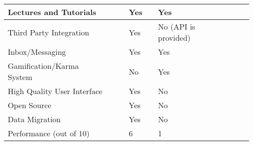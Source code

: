 \begin{table}[ht]
{\begin{tabular}{llllllll}
        \multicolumn{1}{|l|}{Lectures and Tutorials}      & \multicolumn{1}{l|}{} & \multicolumn{1}{l|}{} & \multicolumn{1}{l|}{Yes} & \multicolumn{1}{l|}{} & \multicolumn{1}{l|}{Yes}                       & \multicolumn{1}{l|}{} & \multicolumn{1}{l|}{} \\ \hline
        \multicolumn{1}{|l|}{Third Party Integration}     & \multicolumn{1}{l|}{} & \multicolumn{1}{l|}{} & \multicolumn{1}{l|}{Yes} & \multicolumn{1}{l|}{} & \multicolumn{1}{l|}{No (API is provided)}      & \multicolumn{1}{l|}{} & \multicolumn{1}{l|}{} \\ \hline
        \multicolumn{1}{|l|}{Inbox/Messaging}             & \multicolumn{1}{l|}{} & \multicolumn{1}{l|}{} & \multicolumn{1}{l|}{Yes} & \multicolumn{1}{l|}{} & \multicolumn{1}{l|}{Yes}                       & \multicolumn{1}{l|}{} & \multicolumn{1}{l|}{} \\ \hline
        \multicolumn{1}{|l|}{Gamification/Karma System}   & \multicolumn{1}{l|}{} & \multicolumn{1}{l|}{} & \multicolumn{1}{l|}{No} & \multicolumn{1}{l|}{} & \multicolumn{1}{l|}{Yes}                       & \multicolumn{1}{l|}{} & \multicolumn{1}{l|}{} \\ \hline
        \multicolumn{1}{|l|}{High Quality User Interface} & \multicolumn{1}{l|}{} & \multicolumn{1}{l|}{} & \multicolumn{1}{l|}{Yes} & \multicolumn{1}{l|}{} & \multicolumn{1}{l|}{No}                        & \multicolumn{1}{l|}{} & \multicolumn{1}{l|}{} \\ \hline
        \multicolumn{1}{|l|}{Open Source}                 & \multicolumn{1}{l|}{} & \multicolumn{1}{l|}{} & \multicolumn{1}{l|}{Yes} & \multicolumn{1}{l|}{} & \multicolumn{1}{l|}{No}                        & \multicolumn{1}{l|}{} & \multicolumn{1}{l|}{} \\ \hline
        \multicolumn{1}{|l|}{Data Migration}              & \multicolumn{1}{l|}{} & \multicolumn{1}{l|}{} & \multicolumn{1}{l|}{Yes} & \multicolumn{1}{l|}{} & \multicolumn{1}{l|}{No}                        & \multicolumn{1}{l|}{} & \multicolumn{1}{l|}{} \\ \hline
        Performance (out of 10)                           &                       &                       & 6                      &                       & 1                                              &                       &                       \\ \hline
    \end{tabular}}
\end{table}




